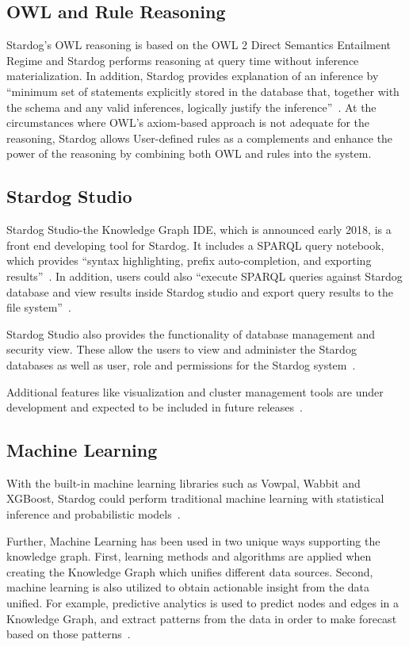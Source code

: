 \subsection{OWL and Rule Reasoning}
Stardog’s OWL reasoning is based on the OWL 2 Direct Semantics Entailment 
Regime and Stardog performs reasoning at query time without inference 
materialization. In addition, Stardog provides explanation of an inference by 
``minimum set of statements explicitly stored in the database that, together 
with the schema and any valid inferences, logically justify the 
inference''~\cite{hid-sp18-405-www-stardog-docs}. At the circumstances 
where OWL’s axiom-based approach is not adequate for the reasoning, 
Stardog allows User-defined rules as a complements and enhance the power 
of the reasoning by combining both OWL and rules into the system. 

\subsection{Stardog Studio}
Stardog Studio-the Knowledge Graph IDE, which is announced early 2018, is 
a front end developing tool for Stardog. It includes a SPARQL query 
notebook, which provides ``syntax highlighting, prefix auto-completion, and 
exporting results''~\cite{hid-sp18-405-blog-stardog-studio}. In addition, 
users could also ``execute SPARQL queries against Stardog database and 
view results inside Stardog studio and export query results to the file 
system''~\cite{hid-sp18-405-www-stardog-studio}.

Stardog Studio also provides the functionality of database management and 
security view. These allow the users to view and administer the Stardog 
databases as well as user, role and permissions for the Stardog 
system~\cite{hid-sp18-405-blog-stardog-studio}.

Additional features like visualization and cluster management tools are under 
development and expected to be included in future 
releases~\cite{hid-sp18-405-www-stardog-studio}.

\subsection{Machine Learning}
With the built-in machine learning libraries such as Vowpal, Wabbit and 
XGBoost, Stardog could perform traditional machine learning with statistical 
inference and probabilistic 
models~\cite{hid-sp18-405-blog-stardog-xgboost}. 

Further, Machine Learning has been used in two unique ways supporting the 
knowledge graph. First, learning methods and algorithms are applied when 
creating  the Knowledge Graph which unifies different data sources. Second,  
machine learning is also utilized to obtain actionable insight from the data 
unified. For example, predictive analytics is used to predict nodes and
edges in a Knowledge Graph, and extract patterns from the data in order to 
make forecast based on those patterns~\cite{hid-sp18-405-blog-stardog-ml}.


